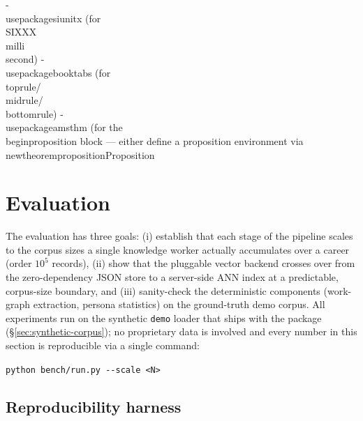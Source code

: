 %   
  - \\usepackage{siunitx}  (for \\SI{XXX}{\\milli\\second})
  - \\usepackage{booktabs} (for \\toprule/\\midrule/\\bottomrule)
  - \\usepackage{amsthm}   (for the \\begin{proposition} block — either define a proposition environment via \\newtheorem{proposition}{Proposition}

\section{Evaluation}
\label{sec:eval}

The evaluation has three goals: (i) establish that each stage of the pipeline
scales to the corpus sizes a single knowledge worker actually accumulates over
a career (order $10^{5}$ records), (ii) show that the pluggable vector backend
crosses over from the zero-dependency JSON store to a server-side ANN index at
a predictable, corpus-size boundary, and (iii) sanity-check the deterministic
components (work-graph extraction, persona statistics) on the ground-truth demo
corpus. All experiments run on the synthetic \texttt{demo} loader that ships with
the package (\S\ref{sec:synthetic-corpus}); no proprietary data is involved and
every number in this section is reproducible via a single command:
\begin{center}
\texttt{python bench/run.py -{}-scale <N>}
\end{center}

\subsection{Reproducibility harness}
\label{sec:bench-harness}

